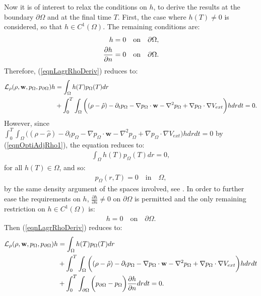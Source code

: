 Now it is of interest to relax the conditions on $h$, to derive the results at the boundary $\partial \Omega$ and at the final time $T$.
First, the case where $h(T) \neq 0$ is considered, so that $h \in C^1(\Omega)$. The remaining conditions are:
\begin{align}\label{condHChoice2}
h&=0 \quad \text{on} \quad \partial \Omega, \\
\frac{\partial h}{\partial n}&=0 \quad \text{on} \quad \partial \Omega. \notag 
\end{align} 
Therefore, (\ref{eqnLagrRhoDeriv}) reduces to:
\begin{align} 
\mathcal{L}_\rho (\rho,\mathbf{w}, p_\Omega, p_{\partial \Omega}) h &=\int_\Omega h(T) p_\Omega(T) dr \notag\\ 
&+\int_0^T \int_\Omega  \bigg( (\rho- \hat{\rho})   - \partial_t  p_\Omega  - \nabla p_\Omega \cdot \mathbf{w}  - \nabla^2 p_\Omega \notag 
  +  \nabla p_\Omega\cdot \nabla V_{ext} \bigg)h dr dt  =0. \notag 
\end{align}
However, since $ \displaystyle \int_0^T \int_\Omega  \bigg( (\rho- \hat{\rho})   - \partial_t  p_\Omega  - \nabla p_\Omega \cdot \mathbf{w}  - \nabla^2 p_\Omega +  \nabla p_\Omega\cdot \nabla V_{ext} \bigg)h dr dt =0$ by (\ref{eqnOptiAdjRho1}), the equation reduces to:
\begin{align}\label{eqnOptiAdjRho2}
\int_\Omega h(T) p_\Omega(T) dr=0,
\end{align}
for all $h(T) \in \Omega$, and so:
\begin{align}\label{eqnOptiAdjRhoFTC}
p_\Omega(r,T)= 0 \quad \text{in} \quad \Omega,
\end{align}
by the same density argument of the spaces involved, see \cite{TroeltzschFredi2010OCoP}.
In order to further ease the requirements on $h$, $\frac{\partial h}{\partial n} \neq 0 $ on $\partial \Omega$ is permitted and the only remaining restriction on $h \in C^1(\Omega)$ is:
\begin{align*}
h=0 \quad \text{on} \quad \partial \Omega.
\end{align*}
Then (\ref{eqnLagrRhoDeriv}) reduces to:
\begin{align*}
\mathcal{L}_\rho (\rho,\mathbf{w}, p_\Omega, p_{\partial \Omega}) h &=\int_\Omega h(T) p_\Omega(T) dr\\
&+ \int_0^T \int_\Omega  \bigg( (\rho- \hat{\rho})   - \partial_t  p_\Omega  - \nabla p_\Omega \cdot \mathbf{w}  - \nabla^2 p_\Omega \notag 
  +  \nabla p_\Omega\cdot \nabla V_{ext} \bigg)h dr dt  \\
& +  \int_0^T \int_{\partial \Omega} \bigg( p_{\partial \Omega}- p_\Omega \bigg) \frac{\partial h}{\partial n} dr  dt   =0. \notag
\end{align*}
